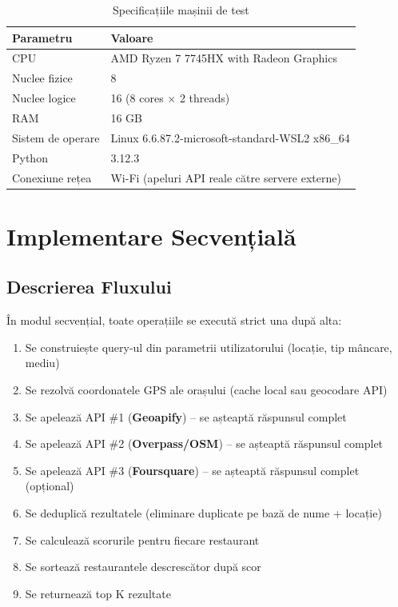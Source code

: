 \documentclass[12pt,a4paper]{article}
\begin{document}
\begin{table}[H]
\centering
\begin{tabular}{ll}
\toprule
\textbf{Parametru} & \textbf{Valoare} \\
\midrule
CPU & AMD Ryzen 7 7745HX with Radeon Graphics \\
Nuclee fizice & 8 \\
Nuclee logice & 16 (8 cores $\times$ 2 threads) \\
RAM & 16 GB \\
Sistem de operare & Linux 6.6.87.2-microsoft-standard-WSL2 x86\_64 \\
Python & 3.12.3 \\
Conexiune rețea & Wi-Fi (apeluri API reale către servere externe) \\
\bottomrule
\end{tabular}
\caption{Specificațiile mașinii de test}
\label{tab:machine}
\end{table}

\section{Implementare Secvențială}

\subsection{Descrierea Fluxului}

În modul secvențial, toate operațiile se execută strict una după alta:

\begin{enumerate}
    \item Se construiește query-ul din parametrii utilizatorului (locație, tip mâncare, mediu)
    \item Se rezolvă coordonatele GPS ale orașului (cache local sau geocodare API)
    \item Se apelează API \#1 (\textbf{Geoapify}) -- se așteaptă răspunsul complet
    \item Se apelează API \#2 (\textbf{Overpass/OSM}) -- se așteaptă răspunsul complet
    \item Se apelează API \#3 (\textbf{Foursquare}) -- se așteaptă răspunsul complet (opțional)
    \item Se deduplică rezultatele (eliminare duplicate pe bază de nume + locație)
    \item Se calculează scorurile pentru fiecare restaurant
    \item Se sortează restaurantele descrescător după scor
    \item Se returnează top K rezultate
\end{enumerate}
\end{document}
